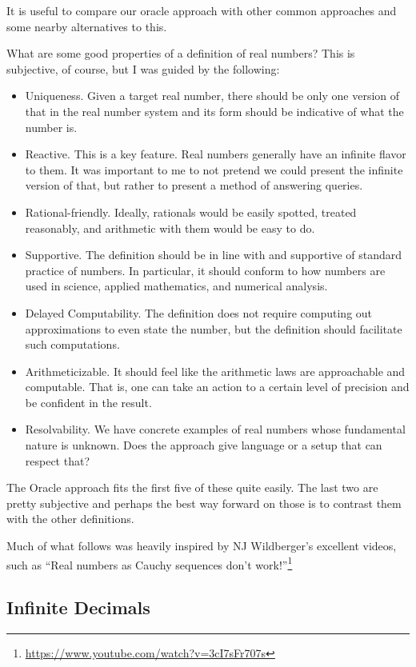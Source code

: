\documentclass[12pt]{article}
\begin{document}
It is useful to compare our oracle approach with other common approaches and some nearby alternatives to this. 

What are some good properties of a definition of real numbers? This is subjective, of course, but I was guided by the following: 

\begin{itemize}
    \item Uniqueness. Given a target real number, there should be only one version of that in the real number system and its form should be indicative of what the number is. 
    \item Reactive. This is a key feature. Real numbers generally have an infinite flavor to them. It was important to me to not pretend we could present the infinite version of that, but rather to present a method of answering queries. 
    \item Rational-friendly. Ideally, rationals would be easily spotted, treated reasonably, and arithmetic with them would be easy to do. 
    \item Supportive. The definition should be in line with and supportive of standard practice of numbers. In particular, it should conform to how numbers are used in science, applied mathematics, and numerical analysis. 
    \item Delayed Computability. The definition does not require computing out approximations to even state the number, but the definition should facilitate such computations. 
    \item Arithmeticizable. It should feel like the arithmetic laws are approachable and computable. That is, one can take an action to a certain level of precision and be confident in the result.
    \item Resolvability. We have concrete examples of real numbers whose fundamental nature is unknown. Does the approach give language or a setup that can respect that? 
\end{itemize}

The Oracle approach fits the first five of these quite easily. The last two are pretty subjective and perhaps the best way forward on those is to contrast them with the other definitions. 

Much of what follows was heavily inspired by NJ Wildberger's excellent videos, such as ``Real numbers as Cauchy sequences don't work!''\footnote{\url{https://www.youtube.com/watch?v=3cI7sFr707s}}


\subsection{Infinite Decimals}
\end{document}

